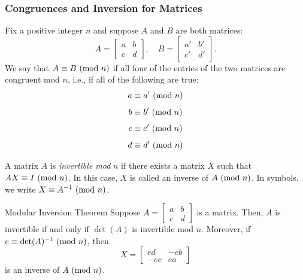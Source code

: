 \documentclass[letterpaper]{article}
\begin{document}
\subsubsection{Congruences and Inversion for Matrices}
\begin{definition}{}{}
    Fix a positive integer $n$ and suppose $A$ and $B$ are both matrices: 
    \[A = \begin{bmatrix}
        a & b \\ c & d
    \end{bmatrix}, \quad B = \begin{bmatrix}
        a' & b' \\ c' & d'
    \end{bmatrix}.\] We say that $A \equiv B \ (\mathrm{mod}\ n)$ if all four of the entries of the two matrices are congruent mod $n$, i.e., if all of the following are true:  
    \[a \equiv a' \ (\mathrm{mod}\ n)\] 
    \[b \equiv b' \ (\mathrm{mod}\ n)\] 
    \[c \equiv c' \ (\mathrm{mod}\ n)\]
    \[d \equiv d' \ (\mathrm{mod}\ n)\]
\end{definition}

\begin{definition}{}{}
    A matrix $A$ is \emph{invertible mod} $n$ if there exists a matrix $X$ such that $AX \equiv I \ (\mathrm{mod}\ n)$. In this case, $X$ is called an inverse of $A \ (\mathrm{mod}\ n)$. In symbols, we write $X \equiv A^{-1} \ (\mathrm{mod}\ n)$. 
\end{definition}

\begin{theorem}{Modular Inversion Theorem}{}
    Suppose $A = \begin{bmatrix}
        a & b \\ c & d
    \end{bmatrix}$ is a matrix. Then, $A$ is invertible if and only if $\det(A)$ is invertible mod $n$. Moreover, if $e \equiv \det(A)^{-1} \ (\mathrm{mod}\ n)$, then \[X = \begin{bmatrix}
        ed & -eb \\ 
        -ec & ea
    \end{bmatrix}\] is an inverse of $A \ (\mathrm{mod}\ n)$. 
\end{theorem}
\end{document}
